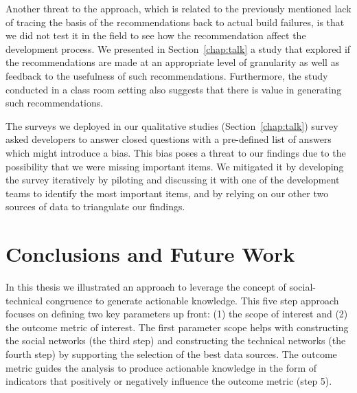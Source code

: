 
Another threat to the approach, which is related to the previously mentioned lack of tracing the basis of the recommendations back to actual build failures, is that we did not test it in the field to see how the recommendation affect the development process.
We presented in Section~\ref{chap:talk} a study that explored if the recommendations are made at an appropriate level of granularity as well as feedback to the usefulness of such recommendations.
Furthermore, the study conducted in a class room setting also suggests that there is value in generating such recommendations.

The surveys we deployed in our qualitative studies (Section~\ref{chap:talk}) survey asked developers to answer closed questions with a pre-defined list of answers which might introduce a bias.
This bias poses a threat to our findings due to the possibility that we were missing important items.
We mitigated it by developing the survey iteratively by piloting and discussing it with one of the development teams to identify the most important items, and by relying on our other two sources of data to triangulate our findings.











\section{Conclusions and Future Work}
\label{ch:dis:con}
In this thesis we illustrated an approach to leverage the concept of social-technical congruence to generate actionable knowledge.
This five step approach focuses on defining two key parameters up front: (1) the scope of interest and (2) the outcome metric of interest.
The first parameter scope helps with constructing the social networks (the third step) and constructing the technical networks (the fourth step) by supporting the selection of the best data sources.
The outcome metric guides the analysis to produce actionable knowledge in the form of indicators that positively or negatively influence the outcome metric (step 5). 

